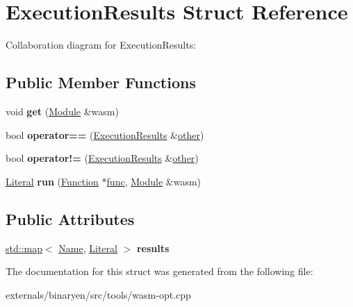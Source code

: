 \hypertarget{struct_execution_results}{}\section{Execution\+Results Struct Reference}
\label{struct_execution_results}


Collaboration diagram for Execution\+Results\+:
\subsection*{Public Member Functions}
\begin{DoxyCompactItemize}
\item 
\mbox{\label{struct_execution_results_abf01b261b5f31f00669f40e71329acf8}} 
void {\bfseries get} (\mbox{\hyperlink{classwasm_1_1_module}{Module}} \&wasm)
\item 
\mbox{\label{struct_execution_results_a0e0ab7b2ccfab75a89ab09525ddfdc2f}} 
bool {\bfseries operator==} (\mbox{\hyperlink{struct_execution_results}{Execution\+Results}} \&\mbox{\hyperlink{structother}{other}})
\item 
\mbox{\label{struct_execution_results_a52814bcdf37668f7305bc5f29845ceb5}} 
bool {\bfseries operator!=} (\mbox{\hyperlink{struct_execution_results}{Execution\+Results}} \&\mbox{\hyperlink{structother}{other}})
\item 
\mbox{\label{struct_execution_results_aadd9b84673465fa2bbbf7a649429bbe7}} 
\mbox{\hyperlink{classwasm_1_1_literal}{Literal}} {\bfseries run} (\mbox{\hyperlink{classwasm_1_1_function}{Function}} $\ast$\mbox{\hyperlink{structfunc}{func}}, \mbox{\hyperlink{classwasm_1_1_module}{Module}} \&wasm)
\end{DoxyCompactItemize}
\subsection*{Public Attributes}
\begin{DoxyCompactItemize}
\item 
\mbox{\label{struct_execution_results_acbd4a78fc2e890ad2b74138745dee22b}} 
\mbox{\hyperlink{classstd_1_1map}{std\+::map}}$<$ \mbox{\hyperlink{structwasm_1_1_name}{Name}}, \mbox{\hyperlink{classwasm_1_1_literal}{Literal}} $>$ {\bfseries results}
\end{DoxyCompactItemize}


The documentation for this struct was generated from the following file\+:\begin{DoxyCompactItemize}
\item 
externals/binaryen/src/tools/wasm-\/opt.\+cpp\end{DoxyCompactItemize}
